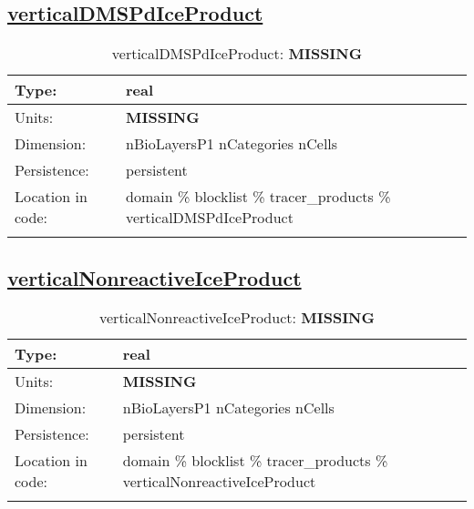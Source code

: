 \subsection[verticalDMSPdIceProduct]{\hyperref[sec:var_tab_tracer_products]{verticalDMSPdIceProduct}}
\label{subsec:var_sec_tracer_products_verticalDMSPdIceProduct}
\begin{center}
\begin{longtable}{| p{2.0in} | p{4.0in} |}
        \hline 
        Type: & real \\
        \hline 
        Units: & {\bf \color{red} MISSING} \\
        \hline 
        Dimension: & nBioLayersP1 nCategories nCells \\
        \hline 
        Persistence: & persistent \\
        \hline 
         Location in code: & domain \% blocklist \% tracer\_products \% verticalDMSPdIceProduct \\
         \hline 
    \caption{verticalDMSPdIceProduct: {\bf \color{red} MISSING}}
\end{longtable}
\end{center}
\subsection[verticalNonreactiveIceProduct]{\hyperref[sec:var_tab_tracer_products]{verticalNonreactiveIceProduct}}
\label{subsec:var_sec_tracer_products_verticalNonreactiveIceProduct}
\begin{center}
\begin{longtable}{| p{2.0in} | p{4.0in} |}
        \hline 
        Type: & real \\
        \hline 
        Units: & {\bf \color{red} MISSING} \\
        \hline 
        Dimension: & nBioLayersP1 nCategories nCells \\
        \hline 
        Persistence: & persistent \\
        \hline 
         Location in code: & domain \% blocklist \% tracer\_products \% verticalNonreactiveIceProduct \\
         \hline 
    \caption{verticalNonreactiveIceProduct: {\bf \color{red} MISSING}}
\end{longtable}
\end{center}

